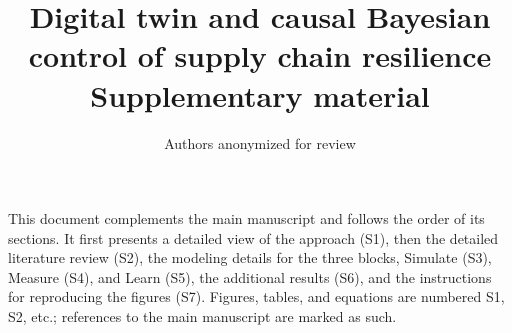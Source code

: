 \documentclass[11pt,a4paper]{article}
\title{Digital twin and causal Bayesian control of supply chain resilience\\[4pt]
\large Supplementary material}
\author{Authors anonymized for review}
\date{}
\begin{document}
\maketitle

\noindent This document complements the main manuscript and follows the order of its sections. It first presents a detailed view of the approach (S1), then the detailed literature review (S2), the modeling details for the three blocks, Simulate (S3), Measure (S4), and Learn (S5), the additional results (S6), and the instructions for reproducing the figures (S7). Figures, tables, and equations are numbered S1, S2, etc.; references to the main manuscript are marked as such.

\tableofcontents











\end{document}
